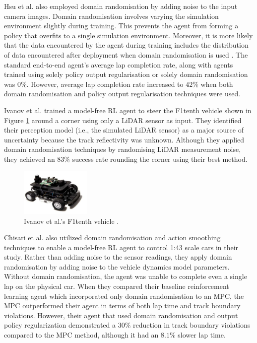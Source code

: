Hsu et al. \cite{hsu2022} also employed domain randomisation by adding noise to the input camera images.
Domain randomisation involves varying the simulation environment slightly during training.
This prevents the agent from forming a policy that overfits to a single simulation environment.
Moreover, it is more likely that the data encountered by the agent during training includes the distribution of data encountered after deployment when domain randomisation is used \cite{Zhou2020}.
The standard end-to-end agent's average lap completion rate, along with agents trained using solely policy output regularisation or solely domain randomisation was $0\%$. 
However, average lap completion rate increased to $42\%$ when both domain randomisation and policy output regularisation techniques were used.

Ivanov et al. \cite{Ivanov2020} trained a model-free RL agent to steer the F1tenth  vehicle  shown in Figure \ref{fig:ivanov} around a corner using only a LiDAR sensor as input.
They identified their perception model (i.e., the simulated LiDAR sensor) as a major source of uncertainty because the track reflectivity was unknown.
Although they applied domain randomisation techniques by randomising LiDAR measurement noise, they achieved an $83\%$ success rate rounding the corner using their best method.

\begin{figure}[htb!]
    \centering
    \includegraphics[width=0.3\textwidth]{contents/chapt2/figs/ivanov.PNG}
    \caption[Ivanov's F1tenth vehicle]{Ivanov et al.'s F1tenth vehicle \cite{Ivanov2020}.}
    \label{fig:ivanov}
\end{figure}


Chisari et al. \cite{Chisari2021} also utilized domain randomisation and action smoothing techniques to enable a model-free RL agent to control 1:43 scale cars in their study. 
Rather than adding noise to the sensor readings, they apply domain randomisation by adding noise to the vehicle dynamics model parameters.
Without domain randomisation, the agent was unable to complete even a single lap on the physical car. 
When they compared their baseline reinforcement learning agent which incorporated only domain randomisation to an MPC, the MPC outperformed their agent in terms of both lap time and track boundary violations. 
However, their agent that used domain randomisation and output policy regularization demonstrated a $30\%$ reduction in track boundary violations compared to the MPC method, although it had an $8.1\%$ slower lap time.

